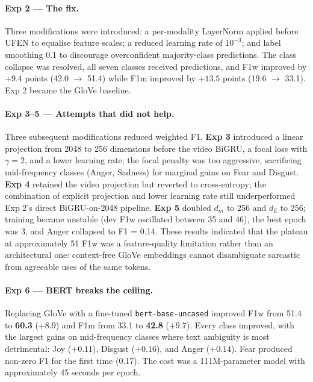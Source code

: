 \documentclass[11pt,twocolumn]{article}
\begin{document}
\paragraph{Exp 2 --- The fix.} Three modifications were introduced: a per-modality LayerNorm applied before UFEN to equalise feature scales; a reduced learning rate of $10^{-3}$; and label smoothing 0.1 to discourage overconfident majority-class predictions. The class collapse was resolved, all seven classes received predictions, and F1w improved by $+9.4$ points (42.0 $\to$ 51.4) while F1m improved by $+13.5$ points (19.6 $\to$ 33.1). Exp 2 became the GloVe baseline.

\paragraph{Exp 3--5 --- Attempts that did not help.} Three subsequent modifications reduced weighted F1. \textbf{Exp 3} introduced a linear projection from 2048 to 256 dimensions before the video BiGRU, a focal loss with $\gamma = 2$, and a lower learning rate; the focal penalty was too aggressive, sacrificing mid-frequency classes (Anger, Sadness) for marginal gains on Fear and Disgust. \textbf{Exp 4} retained the video projection but reverted to cross-entropy; the combination of explicit projection and lower learning rate still underperformed Exp 2's direct BiGRU-on-2048 pipeline. \textbf{Exp 5} doubled $d_m$ to 256 and $d_{\text{ff}}$ to 256; training became unstable (dev F1w oscillated between 35 and 46), the best epoch was 3, and Anger collapsed to F1 = 0.14. These results indicated that the plateau at approximately 51 F1w was a feature-quality limitation rather than an architectural one: context-free GloVe embeddings cannot disambiguate sarcastic from agreeable uses of the same tokens.

\paragraph{Exp 6 --- BERT breaks the ceiling.} Replacing GloVe with a fine-tuned \texttt{bert-base-uncased} improved F1w from 51.4 to \textbf{60.3} ($+8.9$) and F1m from 33.1 to \textbf{42.8} ($+9.7$). Every class improved, with the largest gains on mid-frequency classes where text ambiguity is most detrimental: Joy ($+0.11$), Disgust ($+0.16$), and Anger ($+0.14$). Fear produced non-zero F1 for the first time (0.17). The cost was a 111M-parameter model with approximately 45 seconds per epoch.
\end{document}

